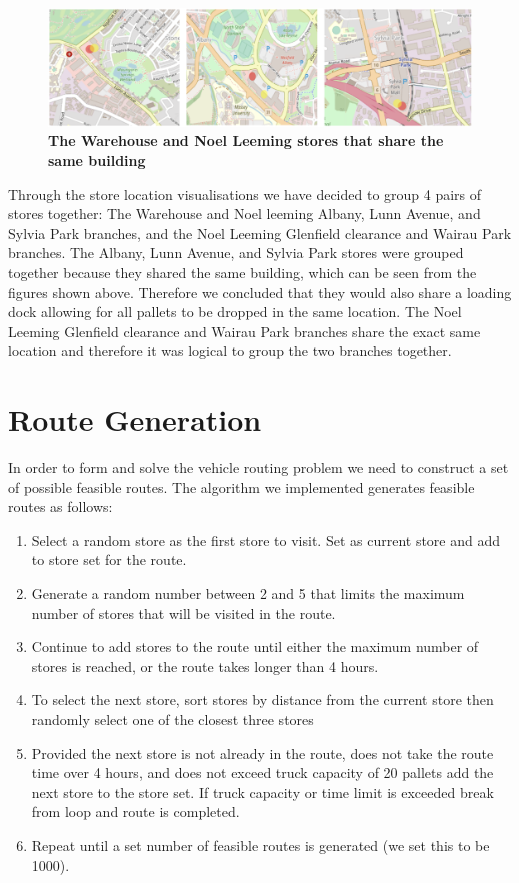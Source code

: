 \documentclass[11pt, a4paper]{article}   	%
\begin{document}
\begin{figure}[H]\centering
\includegraphics[scale=0.7]{S1}
\caption{\textbf{The Warehouse and Noel Leeming stores that share the same building}}
\end{figure}

\noindent Through the store location visualisations we have decided to group 4 pairs of stores together: The Warehouse and Noel leeming Albany, Lunn Avenue, and Sylvia Park branches, and the Noel Leeming Glenfield clearance and Wairau Park branches. The Albany, Lunn Avenue, and Sylvia Park stores were grouped together because they shared the same building, which can be seen from the figures shown above. Therefore we concluded  that they would also share a loading dock allowing for all pallets to be dropped in the same location. The Noel Leeming Glenfield clearance and Wairau Park branches share the exact same location and therefore it was logical to group the two branches together.


\section{Route Generation}
In order to form and solve the vehicle routing problem we need to construct a set of possible feasible routes. The algorithm we implemented generates feasible routes as follows:

\begin{enumerate}
\item Select a random store as the first store to visit. Set as current store and add to store set for the route.
\item Generate a random number between 2 and 5 that limits the maximum number of stores that will be visited in the route.
\item Continue to add stores to the route until either the maximum number of stores is reached, or the route takes longer than 4 hours.
\item To select the next store, sort stores by distance from the current store then randomly select one of the closest three stores
\item Provided the next store is not already in the route, does not take the route time over 4 hours, and does not exceed truck capacity of 20 pallets add the next store to the store set. If truck capacity or time limit is exceeded break from loop and route is completed.
\item Repeat until a set number of feasible routes is generated (we set this to be 1000).
\end{enumerate}
\end{document}
